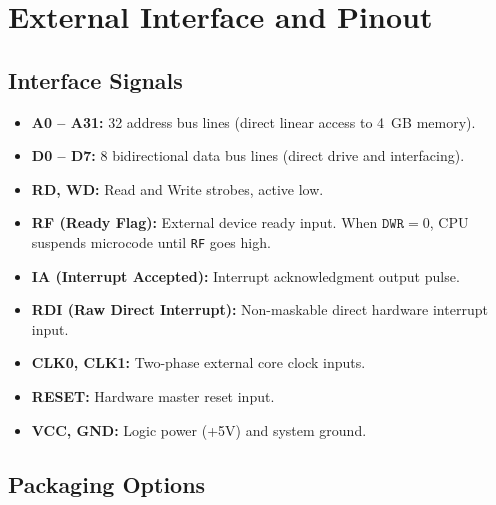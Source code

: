 \documentclass[11pt,a4paper]{article}
\begin{document}
\section{External Interface and Pinout}

\subsection{Interface Signals}
\begin{itemize}
    \item \textbf{A0 -- A31:} 32 address bus lines (direct linear access to 4~GB memory).
    \item \textbf{D0 -- D7:} 8 bidirectional data bus lines (direct drive and interfacing).
    \item \textbf{RD, WD:} Read and Write strobes, active low.
    \item \textbf{RF (Ready Flag):} External device ready input. When \(\texttt{DWR}=0\), CPU suspends microcode until \texttt{RF} goes high.
    \item \textbf{IA (Interrupt Accepted):} Interrupt acknowledgment output pulse.
    \item \textbf{RDI (Raw Direct Interrupt):} Non-maskable direct hardware interrupt input.
    \item \textbf{CLK0, CLK1:} Two-phase external core clock inputs.
    \item \textbf{RESET:} Hardware master reset input.
    \item \textbf{VCC, GND:} Logic power (+5V) and system ground.
\end{itemize}

\subsection{Packaging Options}
\end{document}
